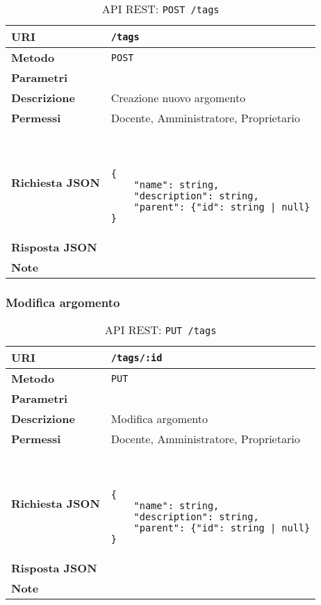     \begin{table}[H]
    	\begin{center}
    		\begin{tabular}{p{} p{}}
    			\toprule
    			\textbf{URI} & \texttt{/tags} \\ \midrule
    			\textbf{Metodo} & \texttt{POST} \\ \midrule
    			\textbf{Parametri} & \\ \midrule
    			\textbf{Descrizione} & Creazione nuovo argomento \\ \midrule
    			\textbf{Permessi} & Docente, Amministratore, Proprietario  \\ \midrule
    			\textbf{Richiesta JSON} & \
	    			\begin{lstlisting}[basicstyle={\ttfamily}]	
{
	"name": string,
	"description": string,
	"parent": {"id": string | null}
}
	    			\end{lstlisting}
    			\\ \midrule
    			\textbf{Risposta JSON} & 
    			\\ \midrule
    			\textbf{Note} & \\
    			\bottomrule
    		\end{tabular}
    		\caption{API REST: \texttt{POST /tags}}
    	\end{center}
    \end{table}
    
    \subsubsection{Modifica argomento}
    
    \begin{table}[H]
    	\begin{center}
    		\begin{tabular}{p{} p{}}
    			\toprule
    			\textbf{URI} & \texttt{/tags/:id} \\ \midrule
    			\textbf{Metodo} & \texttt{PUT} \\ \midrule
    			\textbf{Parametri} & \\ \midrule
    			\textbf{Descrizione} & Modifica argomento \\ \midrule
    			\textbf{Permessi} & Docente, Amministratore, Proprietario  \\ \midrule
    			\textbf{Richiesta JSON} &\
	    			\begin{lstlisting}[basicstyle={\ttfamily}]
{
	"name": string,
	"description": string,
	"parent": {"id": string | null}
}
	    			\end{lstlisting}
    			\\ \midrule
    			\textbf{Risposta JSON} & \\ \midrule
    			\textbf{Note} & \\
    			\bottomrule
    		\end{tabular}
    		\caption{API REST: \texttt{PUT /tags}}
    	\end{center}
    \end{table}
    
